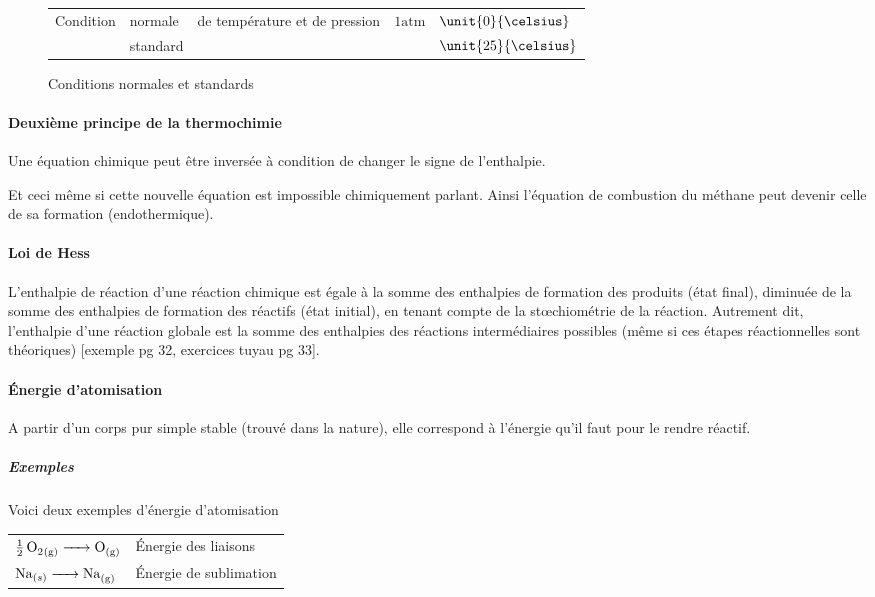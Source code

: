 \documentclass[11pt,a4paper,french]{article}
\newcommand\gaz{_{(g)}}
\newcommand\atm{\mathrm{atm}}
\begin{document}
\begin{figure}[h!]
	\begin{center}
		\begin{tabular}{|lllll|}
			\hline
			\multirow{2}{*}{Condition} & normale & \multirow{2}{*}{de température et de pression} & \multirow{2}{*}{$\unit{1}{\atm}$} & $\unit{0}{\celsius}$\\
			& standard & & & $\unit{25}{\celsius}$\\
			\hline
		\end{tabular}
	\end{center}
	\label{fig:cntp}
	\caption{Conditions normales et standards}
\end{figure}

\paragraph{Deuxième principe de la thermochimie}
Une équation chimique peut être inversée à condition de changer le signe de l'enthalpie.

Et ceci même si cette nouvelle équation est impossible chimiquement parlant.
Ainsi l'équation de combustion du méthane peut devenir celle de sa formation (endothermique).


\paragraph{Loi de Hess}
L'enthalpie de réaction d'une réaction chimique est égale à la somme des enthalpies
de formation des produits (état final), diminuée de la somme des enthalpies de formation des
réactifs (état initial), en tenant compte de la st\oe{}chiométrie de la réaction.
Autrement dit, l'enthalpie d'une réaction globale est la somme des enthalpies des réactions intermédiaires possibles (même si ces étapes réactionnelles sont théoriques) [exemple pg 32, exercices tuyau pg 33].

\paragraph{\'Energie d'atomisation}
A partir d'un corps pur simple stable (trouvé dans la nature), elle correspond à l'énergie qu'il faut pour le rendre réactif.

\subparagraph{Exemples}
Voici deux exemples d'énergie d'atomisation
\begin{center}
	\begin{tabular}{ll}
		$\ce{1/2O2\gaz} \ce{-> O\gaz}$ & \'Energie des liaisons\\
		$\ce{Na}_{(s)} \ce{-> Na\gaz}$ & \'Energie de sublimation
	\end{tabular}
\end{center}
\end{document}
